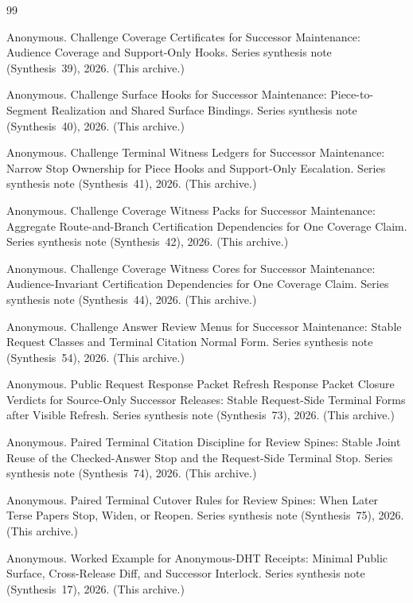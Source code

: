 \documentclass[11pt]{article}
\begin{document}
\begin{thebibliography}{99}\small

Anonymous.
\newblock Challenge Coverage Certificates for Successor Maintenance: Audience Coverage and Support-Only Hooks.
\newblock Series synthesis note (Synthesis~39), 2026. (This archive.)

Anonymous.
\newblock Challenge Surface Hooks for Successor Maintenance: Piece-to-Segment Realization and Shared Surface Bindings.
\newblock Series synthesis note (Synthesis~40), 2026. (This archive.)

Anonymous.
\newblock Challenge Terminal Witness Ledgers for Successor Maintenance: Narrow Stop Ownership for Piece Hooks and Support-Only Escalation.
\newblock Series synthesis note (Synthesis~41), 2026. (This archive.)

Anonymous.
\newblock Challenge Coverage Witness Packs for Successor Maintenance: Aggregate Route-and-Branch Certification Dependencies for One Coverage Claim.
\newblock Series synthesis note (Synthesis~42), 2026. (This archive.)

Anonymous.
\newblock Challenge Coverage Witness Cores for Successor Maintenance: Audience-Invariant Certification Dependencies for One Coverage Claim.
\newblock Series synthesis note (Synthesis~44), 2026. (This archive.)

Anonymous.
\newblock Challenge Answer Review Menus for Successor Maintenance: Stable Request Classes and Terminal Citation Normal Form.
\newblock Series synthesis note (Synthesis~54), 2026. (This archive.)

Anonymous.
\newblock Public Request Response Packet Refresh Response Packet Closure Verdicts for Source-Only Successor Releases: Stable Request-Side Terminal Forms after Visible Refresh.
\newblock Series synthesis note (Synthesis~73), 2026. (This archive.)

Anonymous.
\newblock Paired Terminal Citation Discipline for Review Spines: Stable Joint Reuse of the Checked-Answer Stop and the Request-Side Terminal Stop.
\newblock Series synthesis note (Synthesis~74), 2026. (This archive.)

Anonymous.
\newblock Paired Terminal Cutover Rules for Review Spines: When Later Terse Papers Stop, Widen, or Reopen.
\newblock Series synthesis note (Synthesis~75), 2026. (This archive.)

Anonymous.
\newblock Worked Example for Anonymous-DHT Receipts: Minimal Public Surface, Cross-Release Diff, and Successor Interlock.
\newblock Series synthesis note (Synthesis~17), 2026. (This archive.)

\end{thebibliography}
\end{document}

